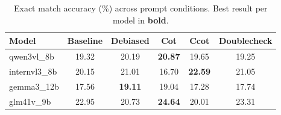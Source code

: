 \begin{table}[t]
\centering
\caption{Exact match accuracy (\%) across prompt conditions. Best result per model in \textbf{bold}.}
\label{tab:main}
\begin{tabular}{lccccc}
\hline
Model & Baseline & Debiased & Cot & Ccot & Doublecheck \\
\hline
qwen3vl\_8b & 19.32 & 20.19 & \textbf{20.87} & 19.65 & 19.25 \\
internvl3\_8b & 20.15 & 21.01 & 16.70 & \textbf{22.59} & 21.05 \\
gemma3\_12b & 17.56 & \textbf{19.11} & 19.04 & 17.28 & 17.74 \\
glm41v\_9b & 22.95 & 20.73 & \textbf{24.64} & 20.01 & 23.31 \\
\hline
\end{tabular}
\end{table}